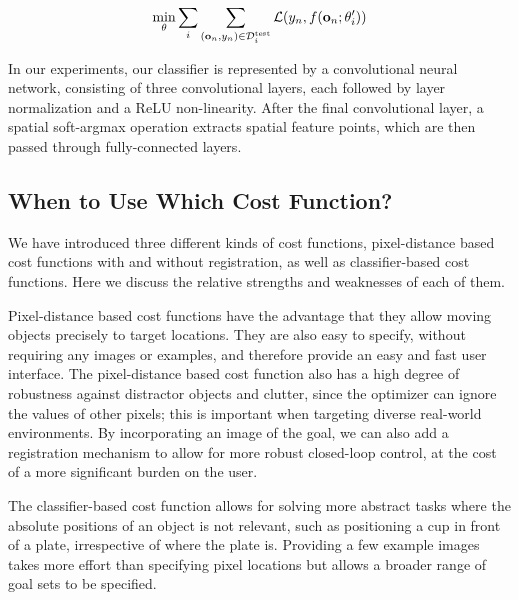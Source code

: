 $$
\min_\theta \sum_i \sum_{(\mathbf{o}_n, y_n) \in \mathcal{D}^\text{test}_i} \mathcal{L}(y_n, f(\mathbf{o}_n; \theta_i')) 
$$

In our experiments, our classifier is represented by a convolutional neural network, consisting of three convolutional layers, each followed by layer normalization and a ReLU non-linearity. After the final convolutional layer, a spatial soft-argmax operation extracts spatial feature points, which are then passed through fully-connected layers.

\subsection{When to Use Which Cost Function?}
\label{subsec:cost_discuission}

We have introduced three different kinds of cost functions, pixel-distance based cost functions with and without registration, as well as classifier-based cost functions. Here we discuss the relative strengths and weaknesses of each of them.

Pixel-distance based cost functions have the advantage that they allow moving objects precisely to target locations. They are also easy to specify, without requiring any images or examples, and therefore provide an easy and fast user interface. The pixel-distance based cost function also has a high degree of robustness against distractor objects and clutter, since the optimizer can ignore the values of other pixels; this is important when targeting diverse real-world environments.
By incorporating an image of the goal, we can also add a registration mechanism to allow for more robust closed-loop control, at the cost of a more significant burden on the user.

The classifier-based cost function allows for solving more abstract tasks where the absolute positions of an object is not relevant, such as positioning a cup in front of a plate, irrespective of where the plate is.  Providing a few example images takes more effort than specifying pixel locations but allows a broader range of goal sets to be specified.

